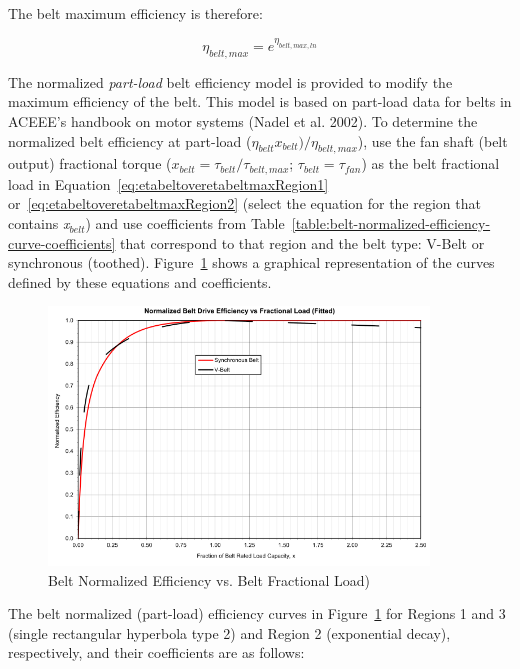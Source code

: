 The belt maximum efficiency is therefore:

\begin{equation}
{\eta_{belt,max }} = {e^{{\eta_{belt,max,ln}}}}
\end{equation}

The normalized \emph{part-load} belt efficiency model is provided to modify the maximum efficiency of the belt. This model is based on part-load data for belts in ACEEE's handbook on motor systems (Nadel et al. 2002). To determine the normalized belt efficiency at part-load (\(\eta_{belt} {x_{belt}}) / \eta_{belt,max}\)), use the fan shaft (belt output) fractional torque (\(x_{belt} = \tau_{belt} / \tau_{belt,max}\); \(\tau_{belt} = \tau_{fan}\)) as the belt fractional load in Equation~\ref{eq:etabeltoveretabeltmaxRegion1} or~\ref{eq:etabeltoveretabeltmaxRegion2} (select the equation for the region that contains \emph{x\(_{belt}\)}) and use coefficients from Table~\ref{table:belt-normalized-efficiency-curve-coefficients} that correspond to that region and the belt type: V-Belt or synchronous (toothed). Figure~\ref{fig:belt-normalized-efficiency-vs.-belt} shows a graphical representation of the curves defined by these equations and coefficients.

\begin{figure}[hbtp] %
\centering
\includegraphics[width=0.9\textwidth, height=0.9\textheight, keepaspectratio=true]{media/image4910.svg.png}
\caption{Belt Normalized Efficiency vs. Belt Fractional Load) \protect \label{fig:belt-normalized-efficiency-vs.-belt}}
\end{figure}

The belt normalized (part-load) efficiency curves in Figure~\ref{fig:belt-normalized-efficiency-vs.-belt} for Regions 1 and 3 (single rectangular hyperbola type 2) and Region 2 (exponential decay), respectively, and their coefficients are as follows:

